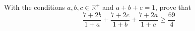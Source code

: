 With the conditions $a,b,c\in\mathbb{R^+}$ and $a+b+c=1$,  prove that \[\frac{7+2b}{1+a}+\frac{7+2c}{1+b}+\frac{7+2a}{1+c}\geq\frac{69}{4}\]